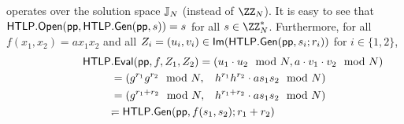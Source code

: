 \noindent {} operates over the solution space $\mathbb{J}_N$ (instead of $\ZZ_N$).
It is easy to see that $\mathsf{HTLP}.\mathsf{Open}(\mathsf{pp},\allowbreak \mathsf{HTLP}.{\sf Gen}(\mathsf{pp}, s)) = s$ for all $s \in \ZZ_N^*$. Furthermore, for all $f(x_1, x_2) = a x_1 x_2$ and all $Z_i = (u_i, v_i) \in {\sf Im}(\mathsf{HTLP}.{\sf Gen}(\mathsf{pp},\allowbreak s_i; r_i))$ for $i \in \{1,2\}$,
\begin{align*}
    \htlp&\rlap{$.{\sf Eval}(\pparam, f, Z_1, Z_2) = (u_1 \cdot u_2 \mod{N}, a \cdot v_1 \cdot v_2 \mod{N})$} &&\\
    &= (g^{r_1} g^{r_2} \mod{N}, &&h^{r_1} h^{r_2} \cdot a s_1 s_2 \mod{N})\\
    &= (g^{r_1 + r_2} \mod{N},   &&h^{r_1 + r_2} \cdot a s_1 s_2 \mod{N})\\
    &\rlap{$= \htlp.{\sf Gen}(\pparam, f(s_1, s_2); r_1 + r_2)$}. &&
\end{align*}



